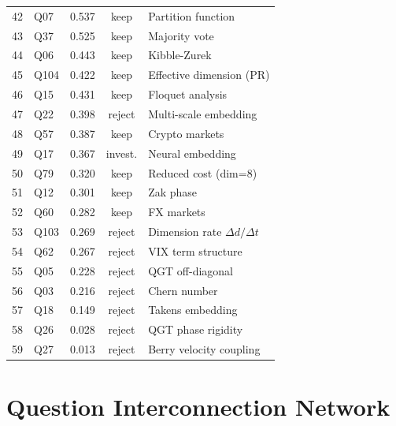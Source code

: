 \documentclass[11pt,a4paper]{article}
\begin{document}
\begin{table}[H]
\begin{tabular}{@{}rlccl@{}}
42 & Q07 & 0.537 & \cellcolor{keepgreen!30}keep & Partition function \\
43 & Q37 & 0.525 & \cellcolor{keepgreen!30}keep & Majority vote \\
44 & Q06 & 0.443 & \cellcolor{keepgreen!30}keep & Kibble-Zurek \\
45 & Q104 & 0.422 & \cellcolor{keepgreen!30}keep & Effective dimension (PR) \\
46 & Q15 & 0.431 & \cellcolor{keepgreen!30}keep & Floquet analysis \\
47 & Q22 & 0.398 & \cellcolor{rejectred!30}reject & Multi-scale embedding \\
48 & Q57 & 0.387 & \cellcolor{keepgreen!30}keep & Crypto markets \\
49 & Q17 & 0.367 & \cellcolor{keepgreen!30}invest. & Neural embedding \\
50 & Q79 & 0.320 & \cellcolor{keepgreen!30}keep & Reduced cost (dim=8) \\
51 & Q12 & 0.301 & \cellcolor{keepgreen!30}keep & Zak phase \\
52 & Q60 & 0.282 & \cellcolor{keepgreen!30}keep & FX markets \\
53 & Q103 & 0.269 & \cellcolor{rejectred!30}reject & Dimension rate $\Delta d/\Delta t$ \\
54 & Q62 & 0.267 & \cellcolor{rejectred!30}reject & VIX term structure \\
55 & Q05 & 0.228 & \cellcolor{rejectred!30}reject & QGT off-diagonal \\
56 & Q03 & 0.216 & \cellcolor{rejectred!30}reject & Chern number \\
57 & Q18 & 0.149 & \cellcolor{rejectred!30}reject & Takens embedding \\
58 & Q26 & 0.028 & \cellcolor{rejectred!30}reject & QGT phase rigidity \\
59 & Q27 & 0.013 & \cellcolor{rejectred!30}reject & Berry velocity coupling \\
\bottomrule
\end{tabular}
\end{table}

\section{Question Interconnection Network}
\end{document}
